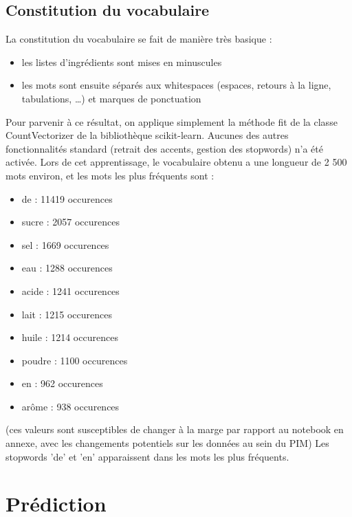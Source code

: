             \subsection{Constitution du vocabulaire}

            La constitution du vocabulaire se fait de manière très basique : 
            \begin{itemize}
                \item les listes d'ingrédients sont mises en minuscules
                \item les mots sont ensuite séparés aux whitespaces (espaces, retours à la ligne, tabulations, \dots) et marques de ponctuation
            \end{itemize}
            Pour parvenir à ce résultat, on applique simplement la méthode fit de la classe CountVectorizer de la bibliothèque scikit-learn.
            Aucunes des autres fonctionnalités standard (retrait des accents, gestion des stopwords) n'a été activée.
            Lors de cet apprentissage, le vocabulaire obtenu a une longueur de 2 500 mots environ, et les mots les plus fréquents sont :
            \begin{itemize}
                \item de     : 11419 occurences
                \item sucre  :  2057 occurences 
                \item sel    :  1669 occurences
                \item eau    :  1288 occurences
                \item acide  :  1241 occurences
                \item lait   :  1215 occurences
                \item huile  :  1214 occurences
                \item poudre :  1100 occurences
                \item en     :   962 occurences
                \item arôme  :   938 occurences
            \end{itemize}
            (ces valeurs sont susceptibles de changer à la marge par rapport au notebook en annexe, avec les changements potentiels sur les données au sein du PIM)
            Les stopwords 'de' et 'en' apparaissent dans les mots les plus fréquents.        
        
        \section{Prédiction}
            
